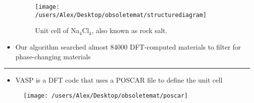 \documentclass[a0]{a0poster}
\def\Head#1{\noindent{\LARGE\color{black} #1}\bigskip}
\begin{document}
\begin{textblock}{7.0}
\begin{itemize}
  \begin{figure}[!ht]\centering
    \texttt{[image: /users/Alex/Desktop/obsoletemat/structurediagram]}
    \caption{\small Unit cell of Na$_4$Cl$_{4}$, also known as rock salt.}
  \end{figure}

\item Our algorithm searched almost 84000 DFT-computed materials to
 filter for phase-changing materials

\end{itemize}

\medskip
\hrule\medskip
\Head{POSCAR}
\vspace{-0.3in}
\begin{itemize}
\item VASP is a DFT code that uses a POSCAR file to define the unit cell
\end{itemize}

\begin{figure}[!ht]\centering
  \texttt{[image: /users/Alex/Desktop/obsoletemat/poscar]}
\end{figure}

\end{textblock}
\end{document}
